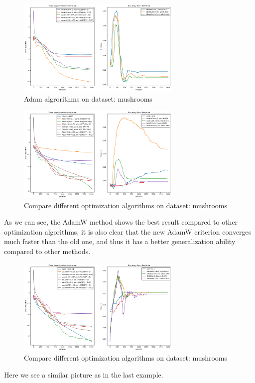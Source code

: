 \documentclass{article}
\begin{document}
\begin{figure}[H]
\centering
    \includegraphics[width=0.7\textwidth]{pictures/mushrooms/main_adam.png}
    \caption{Adam algrorithms on dataset: mushrooms}
    \label{fig:main_mushrooms_adam}
\end{figure}

\begin{figure}[H]
\centering
    \includegraphics[width=0.7\textwidth]{pictures/mushrooms/main_mushrooms.png}
    \caption{Compare different optimization algorithms on dataset: mushrooms}
    \label{fig:main_mushrooms}
\end{figure}
As we can see, the AdamW method shows the best result compared to other optimization algorithms, it is also clear that the new AdamW criterion converges much faster than the old one, and thus it has a better generalization ability compared to other methods.

\begin{figure}[H]
\centering
    \includegraphics[width=0.7\textwidth]{pictures/wine/main_wine.png}
    \caption{Compare different optimization algorithms on dataset: mushrooms}
    
        \label{fig:main_wine}
\end{figure}
Here we see a similar picture as in the last example.
\end{document}
